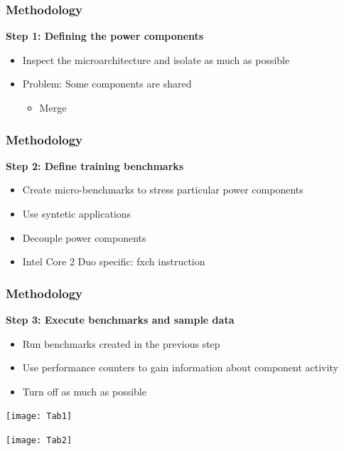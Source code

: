 \documentclass[screen]{beamer}
\begin{document}
\begin{frame}
    \frametitle{Methodology}
    \textbf{Step 1: Defining the power components}

    \begin{itemize}
        \item Inspect the microarchitecture and isolate as much as possible
        \item Problem: Some components are shared
            \begin{itemize}
                \item Merge
            \end{itemize}
    \end{itemize}


\end{frame}

\begin{frame}
    \frametitle{Methodology}
    \textbf{Step 2: Define training benchmarks}

    \begin{itemize}
        \item Create micro-benchmarks to stress particular power components
        \item Use syntetic applications
        \item Decouple power components
        \item Intel Core 2 Duo specific: fxch instruction
    \end{itemize}


\end{frame}
\begin{frame}
    \frametitle{Methodology}
    \textbf{Step 3: Execute benchmarks and sample data}

    \begin{itemize}
        \item Run benchmarks created in the previous step
        \item Use performance counters to gain information about component activity
        \item Turn off as much as possible
    \end{itemize}
\end{frame}

\begin{frame}
    \texttt{[image: Tab1]}
\end{frame}

\begin{frame}
    \texttt{[image: Tab2]}
\end{frame}
\end{document}
